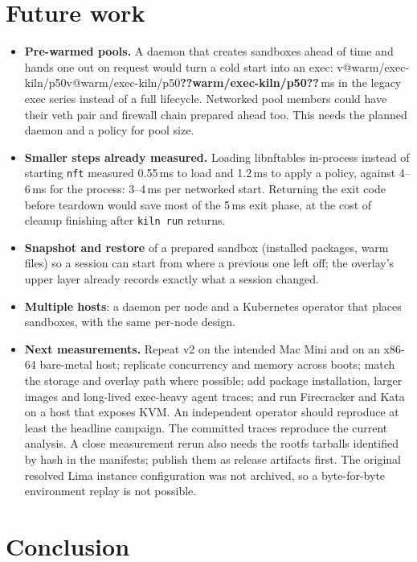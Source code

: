 \documentclass[10pt,letterpaper]{article}
\makeatletter
\newcommand{\code}[1]{\texttt{#1}}
\newcommand{\V}[1]{\ifcsname v@#1\endcsname\csname v@#1\endcsname\else\textbf{??#1??}\fi}
\newcommand{\ms}[1]{\V{#1}\,ms}
\makeatother
\begin{document}
\section{Future work}

\begin{itemize}
\item \textbf{Pre-warmed pools.} A daemon that creates sandboxes ahead of time
and hands one out on request would turn a cold start into an exec:
\ms{warm/exec-kiln/p50} in the legacy exec series instead of a full lifecycle.
Networked pool members could have their veth pair and firewall chain prepared
ahead too. This needs the planned daemon and a policy for pool size.
\item \textbf{Smaller steps already measured.} Loading libnftables in-process
instead of starting \code{nft} measured 0.55\,ms to load and 1.2\,ms to apply a
policy, against 4--6\,ms for the process: 3--4\,ms per networked start. Returning
the exit code before teardown would save most of the 5\,ms exit phase, at the
cost of cleanup finishing after \code{kiln run} returns.
\item \textbf{Snapshot and restore} of a prepared sandbox (installed packages,
warm files) so a session can start from where a previous one left off; the
overlay's upper layer already records exactly what a session changed.
\item \textbf{Multiple hosts}: a daemon per node and a Kubernetes operator that
places sandboxes, with the same per-node design.
\item \textbf{Next measurements.} Repeat v2 on the intended Mac Mini and on an
x86-64 bare-metal host; replicate concurrency and memory across boots; match
the storage and overlay path where possible; add package installation, larger
images and long-lived exec-heavy agent traces; and run Firecracker and Kata on
a host that exposes KVM. An independent operator should reproduce at least the
headline campaign. The committed traces reproduce the current analysis. A close
measurement rerun also needs the rootfs tarballs identified by hash in the
manifests; publish them as release artifacts first. The original resolved Lima
instance configuration was not archived, so a byte-for-byte environment replay
is not possible.
\end{itemize}

\section{Conclusion}
\end{document}
